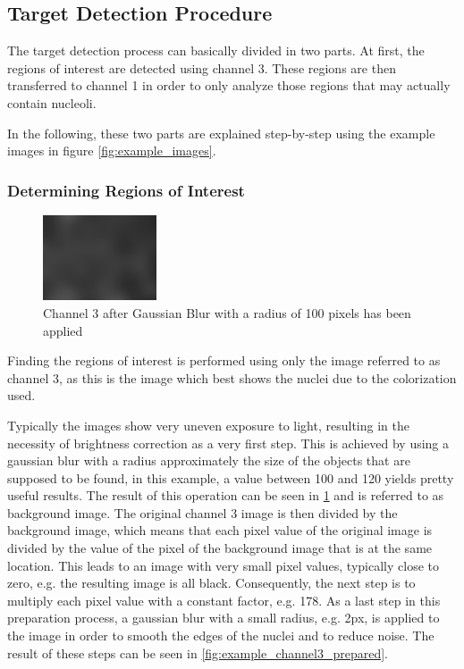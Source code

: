 \documentclass[a4paper, 12pt]{article}
\begin{document}
\subsection{Target Detection Procedure}
The target detection process can basically divided in two parts. At first, the
regions of interest are detected using channel 3. These regions are then
transferred to channel 1 in order to only analyze those regions that may
actually contain nucleoli.

In the following, these two parts are explained step-by-step using the example
images in figure \ref{fig:example_images}.


\subsubsection{Determining Regions of Interest}

\begin{figure}
\vspace{-14pt}
\includegraphics[width=0.3\textwidth]{images/example_Kanal3_gaussian100}
\caption{Channel 3 after Gaussian Blur with a radius of 100 pixels has been
applied}
\label{fig:example_channel3_gaussian}
\vspace{-28pt}
\end{figure}
Finding the regions of interest is performed using only the image referred to as
channel 3, as this is the image which best shows the nuclei due to the
colorization used.

Typically the images show very uneven exposure to light, resulting in the
necessity of brightness correction as a very first step. This is achieved by
using a gaussian blur with a radius approximately the size of the objects that
are supposed to be found, in this example, a value between 100 and 120 yields
pretty useful results. The result of this operation can be seen in
\ref{fig:example_channel3_gaussian} and is referred to as background image. The
original channel 3 image is then divided by the background image, which means
that each pixel value of the original image is divided by the value of the pixel
of the background image that is at the same location. 
This leads to an image with very small pixel values, typically close to zero,
e.g. the resulting image is all black. Consequently, the next step is to
multiply each pixel value with a constant factor, e.g. 178. As a last step in
this preparation process, a gaussian blur with a small radius, e.g. 2px, is
applied to the image in order to smooth the edges of the nuclei and to reduce
noise. The result of these steps can be seen in \ref{fig:example_channel3_prepared}.
\end{document}
